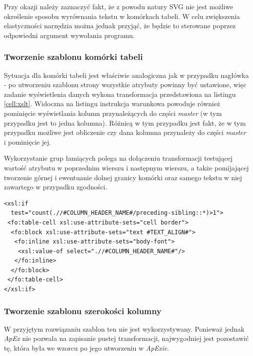 \documentclass[11pt,a4paper]{article}
\begin{document}
Przy okazji należy zaznaczyć fakt, że z powodu natury SVG nie jest możliwe określenie sposobu wyrównania tekstu w komórkach tabeli. W celu zwiększenia elastyczności narzędzia można jednak przyjąć, że będzie to sterowane poprzez odpowiedni argument wywołania programu.

\subsubsection{Tworzenie szablonu komórki tabeli}
Sytuacja dla komórki tabeli jest właściwie analogiczna jak w przypadku nagłówka - po utworzeniu szablonu strony wszystkie atrybuty powinny być ustawione, więc zadanie wyświetlenia danych wykona transformacja przedstawiona na listingu \ref{cell:xslt}. Widoczna na listingu instrukcja warunkowa powoduje również pominięcie wyświetlania kolumn przynależących do części \emph{master} (w tym przypadku jest to jedna kolumna). Różnicą w tym przypadku jest fakt, że w tym przypadku możliwe jest obliczenie czy dana kolumna przynależy do części \emph{master} i pominięcie jej. 

Wykorzystanie grup łamiących polega na dołączeniu transformacji testującej wartość atrybutu w poprzednim wierszu i następnym wierszu, a także pomijającej tworzenie górnej i ewentuanie dolnej granicy komórki oraz samego tekstu w niej zawartego w przypadku zgodności.

\lstset{language=XSLT}
\begin{lstlisting}[frame=single,caption=Transformacja dla komórki tabeli, label=cell:xslt]
<xsl:if 
  test="count(.//#COLUMN_HEADER_NAME#/preceding-sibling::*)>1">
 <fo:table-cell xsl:use-attribute-sets="cell border">
  <fo:block xsl:use-attribute-sets="text #TEXT_ALIGN#">
   <fo:inline xsl:use-attribute-sets="body-font">
    <xsl:value-of select=".//#COLUMN_HEADER_NAME#"/>
   </fo:inline>
  </fo:block>
 </fo:table-cell>
</xsl:if>
\end{lstlisting}


\subsubsection{Tworzenie szablonu szerokości kolumny}
W przyjętym rozwiązaniu szablon ten nie jest wykorzystywany. Ponieważ jednak \emph{ApEx} nie pozwala na zapisanie pustej transformacji, najwygodniej jest pozostawić tę, która była we wzorcu po jego utworzeniu w \emph{ApExie}.
\newpage
\end{document}
